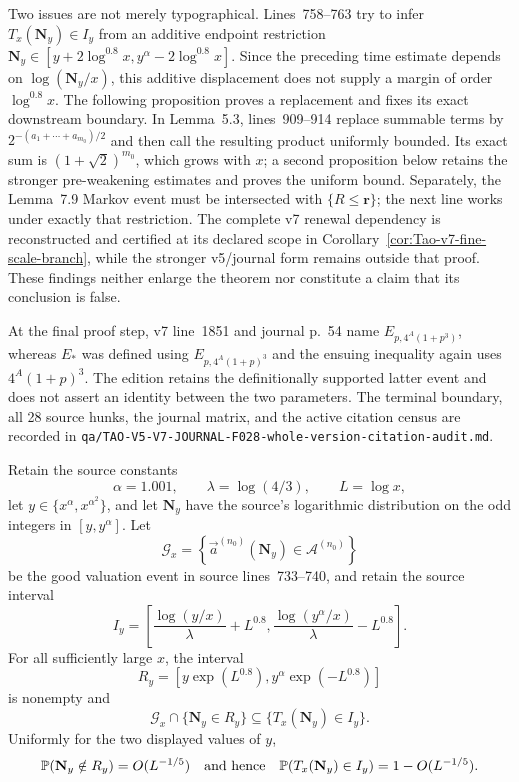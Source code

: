 \begin{sourceissue}
Two issues are not merely typographical.  Lines~758--763 try to infer
$T_x(\mathbf N_y)\in I_y$ from an additive endpoint restriction
$\mathbf N_y\in[y+2\log^{0.8}x,y^\alpha-2\log^{0.8}x]$.  Since the preceding
time estimate depends on $\log(\mathbf N_y/x)$, this additive displacement
does not supply a margin of order $\log^{0.8}x$.  The following proposition
proves a replacement and fixes its exact downstream boundary.  In Lemma~5.3,
lines~909--914 replace summable terms by
$2^{-(a_1+\cdots+a_{m_0})/2}$ and then call the resulting product uniformly
bounded.  Its exact sum is $(1+\sqrt2)^{m_0}$, which grows with $x$; a second
proposition below retains the stronger pre-weakening estimates and proves the
uniform bound.  Separately,
the Lemma~7.9
Markov event must be intersected with $\{R\leq\mathbf r\}$; the next line
works under exactly that restriction.  The complete v7 renewal dependency is
reconstructed and certified at its declared scope in
Corollary~\ref{cor:Tao-v7-fine-scale-branch}, while the stronger v5/journal
form remains outside that proof.  These findings neither enlarge the theorem
nor constitute a claim that its conclusion is false.

At the final proof step, v7 line~1851 and journal p.~54 name
\(E_{p,4^A(1+p^3)}\), whereas \(E_*\) was defined using
\(E_{p,4^A(1+p)^3}\) and the ensuing inequality again uses
\(4^A(1+p)^3\).  The edition retains the definitionally supported latter
event and does not assert an identity between the two parameters.  The
terminal boundary, all 28 source hunks, the journal matrix, and the active
citation census are recorded in
\texttt{qa/TAO-V5-V7-JOURNAL-F028-whole-version-citation-audit.md}.
\end{sourceissue}

\begin{proposition}
\label{prop:Tao-v7-endpoint-buffer}
Retain the source constants
\[
 \alpha=1.001,\qquad \lambda=\log(4/3),\qquad L=\log x,
\]
let $y\in\{x^\alpha,x^{\alpha^2}\}$, and let $\mathbf N_y$ have the source's
logarithmic distribution on the odd integers in $[y,y^\alpha]$.  Let
\[
 \mathcal G_x=
 \left\{\vec a^{(n_0)}(\mathbf N_y)\in
                  \mathcal A^{(n_0)}\right\}
\]
be the good valuation event in source lines~733--740, and retain the source
interval
\[
 I_y=\left[
 \frac{\log(y/x)}{\lambda}+L^{0.8},
 \frac{\log(y^\alpha/x)}{\lambda}-L^{0.8}
 \right].
\]
For all sufficiently large $x$, the interval
\[
 R_y=\left[y\exp(L^{0.8}),
            y^\alpha\exp(-L^{0.8})\right]
\]
is nonempty and
\[
 \mathcal G_x\cap\{\mathbf N_y\in R_y\}
 \subseteq\{T_x(\mathbf N_y)\in I_y\}.
\]
Uniformly for the two displayed values of $y$,
\[
 \mathbb P(\mathbf N_y\notin R_y)=O(L^{-1/5})
 \quad\hbox{and hence}\quad
 \mathbb P(T_x(\mathbf N_y)\in I_y)=1-O(L^{-1/5}).
\]
\end{proposition}

